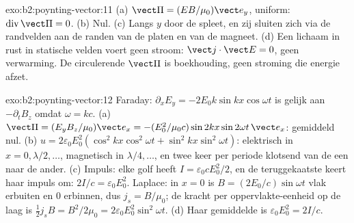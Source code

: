 \begin{solution}{exo:b2:poynting-vector:11}
(a) $\vect\Pi = (EB/\mu_0)\vect e_y$, uniform:
$\operatorname{div}\vect\Pi = 0$. (b) Nul. (c) Langs $y$ door de spleet, en
zij sluiten zich via de randvelden aan de randen van de platen en van de
magneet. (d) Een lichaam in rust in statische velden voert geen stroom:
$\vect j\cdot\vect E = 0$, geen verwarming. De circulerende $\vect\Pi$ is
boekhouding, geen stroming die energie afzet.
\end{solution}

\begin{solution}{exo:b2:poynting-vector:12}
Faraday: $\partial_xE_y = -2E_0k\sin kx\cos\omega t$ is gelijk aan
$-\partial_tB_z$ omdat $\omega = kc$. (a)
$\vect\Pi = (E_yB_z/\mu_0)\vect e_x = -(E_0^2/\mu_0c)\sin2kx\sin2\omega t\,\vect e_x$:
gemiddeld nul. (b)
$u = 2\varepsilon_0E_0^2(\cos^2kx\cos^2\omega t + \sin^2kx\sin^2\omega t)$:
elektrisch in $x = 0, \lambda/2, \dots$, magnetisch in $\lambda/4, \dots$,
en twee keer per periode klotsend van de een naar de ander. (c) Impuls: elke
golf heeft $I = \varepsilon_0cE_0^2/2$, en de teruggekaatste keert haar
impuls om: $2I/c = \varepsilon_0E_0^2$. Laplace: in $x =
0$ is
$B = (2E_0/c)\sin\omega t$ vlak erbuiten en $0$ erbinnen, dus
$j_s = B/\mu_0$; de kracht per oppervlakte-eenheid op de laag is
$\tfrac12j_sB = B^2/2\mu_0 = 2\varepsilon_0E_0^2\sin^2
\omega t$. (d) Haar
gemiddelde is $\varepsilon_0E_0^2 = 2I/c$.
\end{solution}

